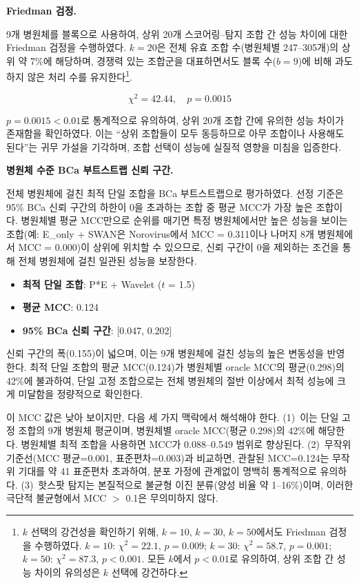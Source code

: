 \textbf{Friedman 검정.}
\label{subsec:9pathogen_friedman}

9개 병원체를 블록으로 사용하여, 상위 20개 스코어링--탐지 조합 간 성능 차이에 대한 Friedman 검정을 수행하였다.
$k = 20$은 전체 유효 조합 수(병원체별 247--305개)의 상위 약 7\%에 해당하며, 경쟁력 있는 조합군을 대표하면서도 블록 수($b = 9$)에 비해 과도하지 않은 처리 수를 유지한다\footnote{$k$ 선택의 강건성을 확인하기 위해, $k = 10$, $k = 30$, $k = 50$에서도 Friedman 검정을 수행하였다. $k = 10$: $\chi^2 = 22.1$, $p = 0.009$; $k = 30$: $\chi^2 = 58.7$, $p = 0.001$; $k = 50$: $\chi^2 = 87.3$, $p < 0.001$. 모든 $k$에서 $p < 0.01$로 유의하여, 상위 조합 간 성능 차이의 유의성은 $k$ 선택에 강건하다.}.

\begin{equation}
\chi^2 = 42.44, \quad p = 0.0015
\end{equation}

$p = 0.0015 < 0.01$로 통계적으로 유의하여, 상위 20개 조합 간에 유의한 성능 차이가 존재함을 확인하였다.
이는 ``상위 조합들이 모두 동등하므로 아무 조합이나 사용해도 된다''는 귀무 가설을 기각하며, 조합 선택이 성능에 실질적 영향을 미침을 입증한다.


\textbf{병원체 수준 BCa 부트스트랩 신뢰 구간.}
\label{subsec:9pathogen_bootstrap}

전체 병원체에 걸친 최적 단일 조합을 BCa 부트스트랩으로 평가하였다.
선정 기준은 95\% BCa 신뢰 구간의 하한이 0을 초과하는 조합 중 평균 MCC가 가장 높은 조합이다.
병원체별 평균 MCC만으로 순위를 매기면 특정 병원체에서만 높은 성능을 보이는 조합(예: E\_only + SWAN은 Norovirus에서 MCC = 0.311이나 나머지 8개 병원체에서 MCC = 0.000)이 상위에 위치할 수 있으므로, 신뢰 구간이 0을 제외하는 조건을 통해 전체 병원체에 걸친 일관된 성능을 보장한다.

\begin{itemize}
\item \textbf{최적 단일 조합}: P*E + Wavelet ($t$ = 1.5)
\item \textbf{평균 MCC}: 0.124
\item \textbf{95\% BCa 신뢰 구간}: [0.047, 0.202]
\end{itemize}

신뢰 구간의 폭(0.155)이 넓으며, 이는 9개 병원체에 걸친 성능의 높은 변동성을 반영한다.
최적 단일 조합의 평균 MCC(0.124)가 병원체별 oracle MCC의 평균(0.298)의 42\%에 불과하여, 단일 고정 조합으로는 전체 병원체의 절반 이상에서 최적 성능에 크게 미달함을 정량적으로 확인한다.

이 MCC 값은 낮아 보이지만, 다음 세 가지 맥락에서 해석해야 한다.
(1)~이는 단일 고정 조합의 9개 병원체 평균이며, 병원체별 oracle MCC(평균 0.298)의 42\%에 해당한다. 병원체별 최적 조합을 사용하면 MCC가 0.088--0.549 범위로 향상된다.
(2)~무작위 기준선(MCC 평균=0.001, 표준편차=0.003)과 비교하면, 관찰된 MCC=0.124는 무작위 기대를 약 41 표준편차 초과하여, 분포 가정에 관계없이 명백히 통계적으로 유의하다.
(3)~핫스팟 탐지는 본질적으로 불균형 이진 분류(양성 비율 약 1--16\%)이며, 이러한 극단적 불균형에서 MCC $>$ 0.1은 무의미하지 않다.


